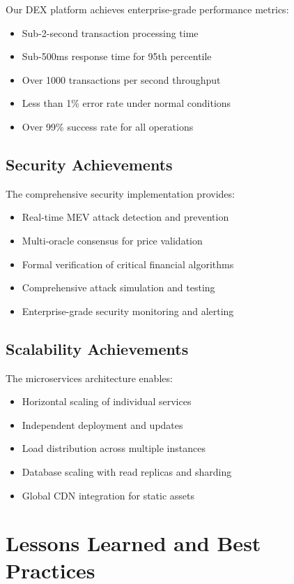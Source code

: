 \documentclass[11pt,a4paper]{article}
\begin{document}
Our DEX platform achieves enterprise-grade performance metrics:
\begin{itemize}
\item Sub-2-second transaction processing time
\item Sub-500ms response time for 95th percentile
\item Over 1000 transactions per second throughput
\item Less than 1\% error rate under normal conditions
\item Over 99\% success rate for all operations
\end{itemize}

\subsection{Security Achievements}

The comprehensive security implementation provides:
\begin{itemize}
\item Real-time MEV attack detection and prevention
\item Multi-oracle consensus for price validation
\item Formal verification of critical financial algorithms
\item Comprehensive attack simulation and testing
\item Enterprise-grade security monitoring and alerting
\end{itemize}

\subsection{Scalability Achievements}

The microservices architecture enables:
\begin{itemize}
\item Horizontal scaling of individual services
\item Independent deployment and updates
\item Load distribution across multiple instances
\item Database scaling with read replicas and sharding
\item Global CDN integration for static assets
\end{itemize}

\section{Lessons Learned and Best Practices}
\end{document}
